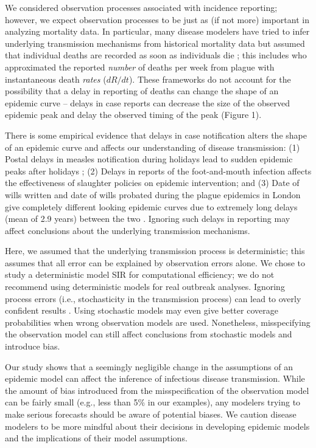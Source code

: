 \documentclass[12pt]{article}\usepackage[]{graphicx}\usepackage[]{color}
\begin{document}
We considered observation processes associated with incidence 
reporting; however, we expect observation processes to be just as 
(if not more) important in analyzing mortality data. In particular,
many disease modelers have
tried to infer underlying transmission mechanisms from historical mortality 
data but assumed that individual deaths are recorded as soon as individuals die 
\citep{he2013inferring, didelot2017model, dean2018human}; this includes
\cite{kermack1927contribution} who approximated the reported \emph{number} of
deaths per week from plague with instantaneous death \emph{rates} ($dR/dt$).
These frameworks do not account for the possibility 
that a delay in reporting of deaths can
change the shape of an epidemic curve -- delays in case reports can decrease
the size of the observed epidemic peak and delay the observed timing of the peak (Figure 1). 

There is some empirical evidence that delays in case notification alters the
shape of an epidemic curve and affects our understanding of disease transmission:
(1) Postal delays in measles notification during holidays lead to sudden
epidemic peaks after holidays \citep{fine1982measles}; 
(2) Delays in reports of the foot-and-mouth infection affects the effectiveness
of slaughter policies on epidemic intervention;
and (3) Date of wills written and date of wills probated during
the plague epidemics in London give completely different looking epidemic curves
due to extremely long delays (mean of 2.9 years) between the two \citep{bushby2019wills}.
Ignoring such delays in reporting may affect conclusions about the underlying 
transmission mechanisms.

Here, we assumed that the underlying transmission process is deterministic; this 
assumes that all error can be explained by observation errors alone. 
We chose to study a deterministic model SIR for computational efficiency; 
we do not recommend using deterministic models for real outbreak analyses.
Ignoring process errors (i.e., stochasticity in the transmission process) can lead to
overly confident results \citep{king2015avoidable}. Using stochastic models may
even give better coverage probabilities when wrong observation models are used. 
Nonetheless, misspecifying the observation model can still affect conclusions from 
stochastic models and introduce bias.

Our study shows that a seemingly negligible change in the assumptions of an epidemic
model can affect the inference of infectious disease transmission.
While the amount of bias introduced from the misspecification of the observation
model can be fairly small (e.g., less than 5\% in our examples), any modelers
trying to make serious forecasts should be aware of potential biases.
We caution disease modelers to be more mindful about their decisions in developing
epidemic models and the implications of their model assumptions.


\end{document}
